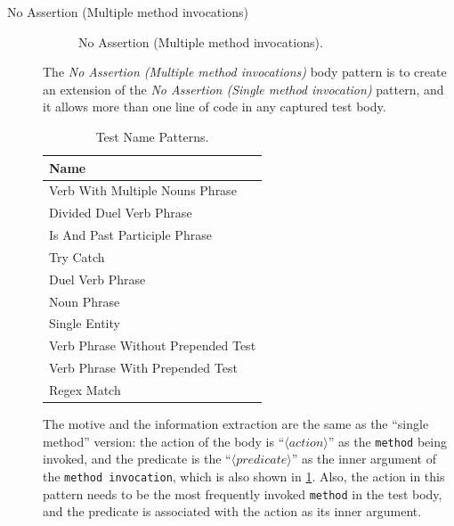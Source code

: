 \begin{description}
\item[No Assertion (Multiple method invocations)]

\begin{figure}[htbp]
\centering
    \begin{subfigure}{0.45\textwidth}
    \end{subfigure}
\caption{No Assertion (Multiple method invocations).}
\label{NoAstP_m_MC}
\end{figure}

The \textit{No Assertion (Multiple method invocations)} body pattern is to create an extension of the \textit{No Assertion (Single method invocation)} pattern, and it allows more than one line of code in any captured test body.

\begin{table}[H]
\scriptsize
\centering
\caption{Test Name Patterns.}
 \begin{tabular}{l} 
 \toprule
 \textbf{Name} \\
 \midrule
 Verb With Multiple Nouns Phrase \\
 Divided Duel Verb Phrase \\
 Is And Past Participle Phrase \\
 Try Catch \\
 Duel Verb Phrase \\
 Noun Phrase \\
 Single Entity \\
 Verb Phrase Without Prepended Test \\
 Verb Phrase With Prepended Test \\
 Regex Match \\
 \bottomrule
\end{tabular}
\label{tab:name-patterns}
\end{table}

The motive and the information extraction are the same as the \enquote{single method} version: the action of the body is \enquote{$\langle action \rangle$} as the \texttt{method} being invoked, and the predicate is the \enquote{$\langle predicate \rangle$} as the inner argument of the \texttt{method invocation}, which is also shown in \cref{NoAstP_m_MC}.
%
Also, the action in this pattern needs to be the most frequently invoked \texttt{method} in the test body, and the predicate is associated with the action as its inner argument.

\end{description}



